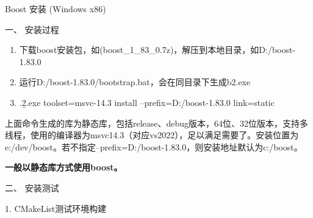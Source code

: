 \documentclass[AutoFakeBold,AutoFakeSlant]{article}
\begin{document}
	
	\begin{center}
		\Huge 
		Boost 安装 (Windows x86)
	\end{center}
	
	\leftline
	\bigskip
	\begin{flushleft}
		\begin{huge}
			一、 安装过程
		\end{huge}
		
		\large 
		\linespread{1.2} \selectfont
		\begin{enumerate}
			\item 下载boost安装包，如(boost\_1\_83\_0.7z)，解压到本地目录，如D:/boost-1.83.0
			\item 运行D:/boost-1.83.0/bootstrap.bat，会在同目录下生成b2.exe
			\item .\b2.exe toolset=msvc-14.3 install --prefix=D:/boost-1.83.0 link=static
		\end{enumerate}
		
		\bigskip
		
		上面命令生成的库为静态库，包括release、debug版本，64位、32位版本，支持多线程，使用的编译器为msvc14.3（对应vs2022），足以满足需要了。安装位置为e:/dev/boost。若不指定--prefix=D:/boost-1.83.0，则安装地址默认为c:/boost。
		
		\bigskip
		
		\textbf{一般以静态库方式使用boost。}
		
		
		\vspace{3cm}
		
		\begin{huge}
			二、 安装测试
		\end{huge}
		
		\bigskip
		\large
		1. CMakeList测试环境构建
		
	\end{flushleft}
	
\end{document}
